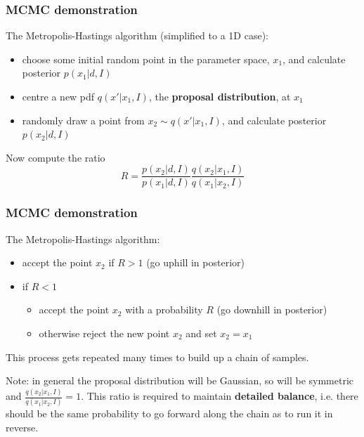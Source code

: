 \begin{frame}

\frametitle{MCMC demonstration}
\label{mcmcdemonstration}

The Metropolis-Hastings algorithm (simplified to a 1D case):

\begin{itemize}
\item choose some initial random point in the parameter space, $x_1$, and calculate posterior $p(x_1|d,I)$

\item centre a new pdf $q(x'|x_1,I)$, the \textbf{proposal distribution}, at $x_1$

\item randomly draw a point from $x_2 \sim q(x'|x_1,I)$, and calculate posterior $p(x_2|d,I)$

\end{itemize}

Now compute the ratio
\[
R = \frac{p(x_2|d,I)}{p(x_1|d,I)} \frac{q(x_2|x_1,I)}{q(x_1|x_2,I)}
\]

\end{frame}

\begin{frame}

\frametitle{MCMC demonstration}
\label{mcmcdemonstration}

The Metropolis-Hastings algorithm:

\begin{itemize}
\item accept the point $x_2$ if $R > 1$ (go uphill in posterior)

\item if $R<1$

\begin{itemize}
\item accept the point $x_2$ with a probability $R$ (go downhill in posterior)

\item otherwise reject the new point $x_2$ and set $x_2 = x_1$

\end{itemize}

\end{itemize}

This process gets repeated many times to build up a chain of samples.

Note: in general the proposal distribution will be Gaussian, so will be symmetric and
$\frac{q(x_2|x_1,I)}{q(x_1|x_2,I)} = 1$. This ratio is required to maintain \textbf{detailed balance},
i.e. there should be the same probability to go forward along the chain as to run it in reverse.

\end{frame}


